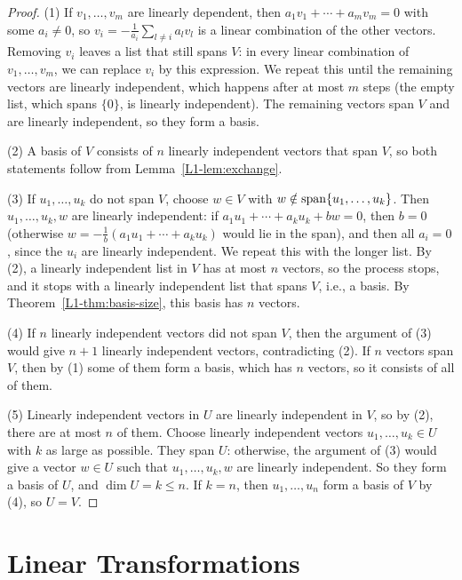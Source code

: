 \begin{proof}
    (1) If $v_1, \ldots, v_m$ are linearly dependent, then $a_1 v_1 + \cdots + a_m v_m = 0$ with some $a_i \neq 0$, so $v_i = -\frac{1}{a_i}\sum_{l \neq i} a_l v_l$ is a linear combination of the other vectors. Removing $v_i$ leaves a list that still spans $V$: in every linear combination of $v_1, \ldots, v_m$, we can replace $v_i$ by this expression. We repeat this until the remaining vectors are linearly independent, which happens after at most $m$ steps (the empty list, which spans $\{0\}$, is linearly independent). The remaining vectors span $V$ and are linearly independent, so they form a basis.

    (2) A basis of $V$ consists of $n$ linearly independent vectors that span $V$, so both statements follow from Lemma~\ref{L1-lem:exchange}.

    (3) If $u_1, \ldots, u_k$ do not span $V$, choose $w \in V$ with $w \notin \operatorname{span}\{u_1, \ldots, u_k\}$. Then $u_1, \ldots, u_k, w$ are linearly independent: if $a_1 u_1 + \cdots + a_k u_k + bw = 0$, then $b = 0$ (otherwise $w = -\frac{1}{b}(a_1 u_1 + \cdots + a_k u_k)$ would lie in the span), and then all $a_i = 0$, since the $u_i$ are linearly independent. We repeat this with the longer list. By (2), a linearly independent list in $V$ has at most $n$ vectors, so the process stops, and it stops with a linearly independent list that spans $V$, i.e., a basis. By Theorem~\ref{L1-thm:basis-size}, this basis has $n$ vectors.

    (4) If $n$ linearly independent vectors did not span $V$, then the argument of (3) would give $n + 1$ linearly independent vectors, contradicting (2). If $n$ vectors span $V$, then by (1) some of them form a basis, which has $n$ vectors, so it consists of all of them.

    (5) Linearly independent vectors in $U$ are linearly independent in $V$, so by (2), there are at most $n$ of them. Choose linearly independent vectors $u_1, \ldots, u_k \in U$ with $k$ as large as possible. They span $U$: otherwise, the argument of (3) would give a vector $w \in U$ such that $u_1, \ldots, u_k, w$ are linearly independent. So they form a basis of $U$, and $\dim U = k \leq n$. If $k = n$, then $u_1, \ldots, u_n$ form a basis of $V$ by (4), so $U = V$.
\end{proof}

\section{Linear Transformations}\label{L1-sec:linear}

